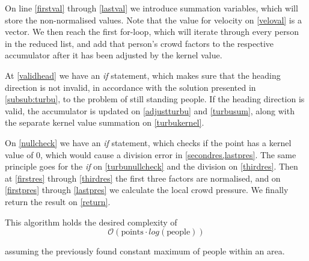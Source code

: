 On line \cref{firstval} through \ref{lastval} we introduce summation variables, which will store the non-normalised values. Note that the value for velocity on \cref{veloval} is a vector. We then reach the first for-loop, which will iterate through every person in the reduced list, and add that person's crowd factors to the respective accumulator after it has been adjusted by the kernel value.

At \cref{validhead} we have an \emph{if} statement, which makes sure that the heading direction is not invalid, in accordance with the solution presented in \cref{subsub:turbu}, to the problem of still standing people. If the heading direction is valid, the accumulator is updated on \cref{adjustturbu} and \ref{turbusum}, along with the separate kernel value summation on \cref{turbukernel}.

On \cref{nullcheck} we have an \emph{if} statement, which checks if the point has a kernel value of $0$, which would cause a division error in \cref{secondres,lastpres}. The same principle goes for the \emph{if} on \cref{turbunullcheck} and the division on \cref{thirdres}.
Then at \cref{firstres} through \ref{thirdres} the first three factors are normalised, and on \cref{firstpres} through \ref{lastpres} we calculate the local crowd pressure. We finally return the result on \cref{return}.

This algorithm holds the desired complexity of $$\mathcal{O}(\text{points} \cdot log(\text{people}))$$

assuming the previously found constant maximum of people within an area.


